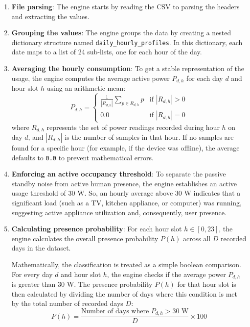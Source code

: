 \begin{enumerate}
    \item \textbf{File parsing}: The engine starts by reading the CSV to parsing the headers and extracting the values.
    
    \item \textbf{Grouping the values}: The engine groups the data by creating a nested dictionary structure named \texttt{daily\_hourly\_profiles}. In this dictionary, each date maps to a list of 24 sub-lists, one for each hour of the day. 

    \item \textbf{Averaging the hourly consumption}:
    To get a stable representation of the usage, the engine computes the average active power $P_{d, h}$ for each day $d$ and hour slot $h$ using an arithmetic mean:
    \[
    P_{d, h} = \begin{cases} 
    \frac{1}{|R_{d, h}|} \sum_{p \in R_{d, h}} p & \text{if } |R_{d, h}| > 0 \\ 
    0.0 & \text{if } |R_{d, h}| = 0 
    \end{cases}
    \]
    where $R_{d, h}$ represents the set of power readings recorded during hour $h$ on day $d$, and $|R_{d, h}|$ is the number of samples in that hour. If no samples are found for a specific hour (for example, if the device was offline), the average defaults to \texttt{0.0} to prevent mathematical errors.

    \item \textbf{Enforcing an active occupancy threshold}:
    To separate the passive standby noise from active human presence, the engine establishes an active usage threshold of $30\text{ W}$. So, an hourly average above $30\text{ W}$ indicates that a significant load (such as a TV, kitchen appliance, or computer) was running, suggesting active appliance utilization and, consequently, user presence. 

    \item \textbf{Calculating presence probability}:
    For each hour slot $h \in [0, 23]$, the engine calculates the overall presence probability $P(h)$ across all $D$ recorded days in the dataset. 
    
    \medskip
    \noindent Mathematically, the classification is treated as a simple boolean comparison. For every day $d$ and hour slot $h$, the engine checks if the average power $P_{d, h}$ is greater than $30\text{ W}$. The presence probability $P(h)$ for that hour slot is then calculated by dividing the number of days where this condition is met by the total number of recorded days $D$:
    \[
    P(h) = \frac{\text{Number of days where } P_{d, h} > 30\text{ W}}{D} \times 100
    \]
    

\end{enumerate}

